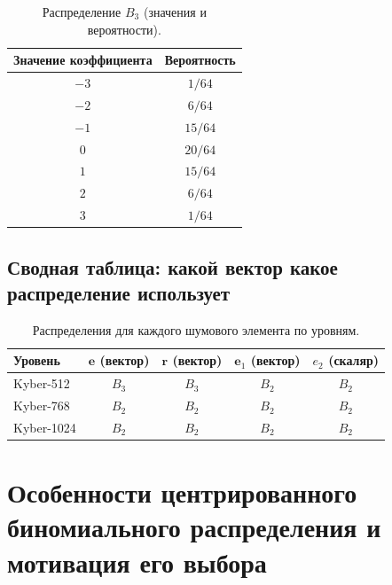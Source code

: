 \documentclass[11pt,a4paper]{article}
\begin{document}
\begin{table}[H]
    \centering
    \begin{tabular}{c c}
        \toprule
        Значение коэффициента & Вероятность \\
        \midrule
        \(-3\)                & \(1/64\)    \\
        \(-2\)                & \(6/64\)    \\
        \(-1\)                & \(15/64\)   \\
        \(0\)                 & \(20/64\)   \\
        \(1\)                 & \(15/64\)   \\
        \(2\)                 & \(6/64\)    \\
        \(3\)                 & \(1/64\)    \\
        \bottomrule
    \end{tabular}
    \caption{Распределение \(B_3\) (значения и вероятности).}
\end{table}

\subsection{Сводная таблица: какой вектор какое распределение использует}

\begin{table}[H]
    \centering
    \begin{tabular}{lcccc}
        \toprule
        Уровень    & \(\mathbf{e}\) (вектор) & \(\mathbf{r}\) (вектор) & \(\mathbf{e}_1\) (вектор) & \(e_2\) (скаляр) \\
        \midrule
        Kyber-512  & \(B_3\)                 & \(B_3\)                 & \(B_2\)                   & \(B_2\)          \\
        Kyber-768  & \(B_2\)                 & \(B_2\)                 & \(B_2\)                   & \(B_2\)          \\
        Kyber-1024 & \(B_2\)                 & \(B_2\)                 & \(B_2\)                   & \(B_2\)          \\
        \bottomrule
    \end{tabular}
    \caption{Распределения для каждого шумового элемента по уровням.}
\end{table}

\newpage
\section{Особенности центрированного биномиального распределения и мотивация его выбора}
\end{document}
